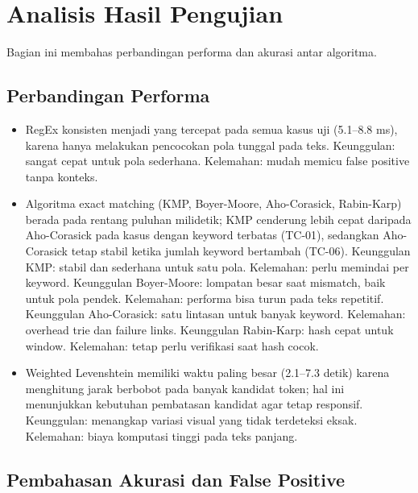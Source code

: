 \section{Analisis Hasil Pengujian}

Bagian ini membahas perbandingan performa dan akurasi antar algoritma.

\subsection{Perbandingan Performa}

\begin{itemize}
	\item RegEx konsisten menjadi yang tercepat pada semua kasus uji
	(5.1--8.8 ms), karena hanya melakukan pencocokan pola tunggal pada teks.
	Keunggulan: sangat cepat untuk pola sederhana. Kelemahan: mudah memicu
	false positive tanpa konteks.
	\item Algoritma exact matching (KMP, Boyer-Moore, Aho-Corasick, Rabin-Karp)
	berada pada rentang puluhan milidetik; KMP cenderung lebih cepat daripada
	Aho-Corasick pada kasus dengan keyword terbatas (TC-01), sedangkan
	Aho-Corasick tetap stabil ketika jumlah keyword bertambah (TC-06).
	Keunggulan KMP: stabil dan sederhana untuk satu pola. Kelemahan: perlu
	memindai per keyword. Keunggulan Boyer-Moore: lompatan besar saat mismatch,
	baik untuk pola pendek. Kelemahan: performa bisa turun pada teks repetitif.
	Keunggulan Aho-Corasick: satu lintasan untuk banyak keyword. Kelemahan:
	overhead trie dan failure links. Keunggulan Rabin-Karp: hash cepat untuk
	window. Kelemahan: tetap perlu verifikasi saat hash cocok.
	\item Weighted Levenshtein memiliki waktu paling besar (2.1--7.3 detik)
	karena menghitung jarak berbobot pada banyak kandidat token; hal ini
	menunjukkan kebutuhan pembatasan kandidat agar tetap responsif.
	Keunggulan: menangkap variasi visual yang tidak terdeteksi eksak.
	Kelemahan: biaya komputasi tinggi pada teks panjang.
\end{itemize}

\subsection{Pembahasan Akurasi dan False Positive}

